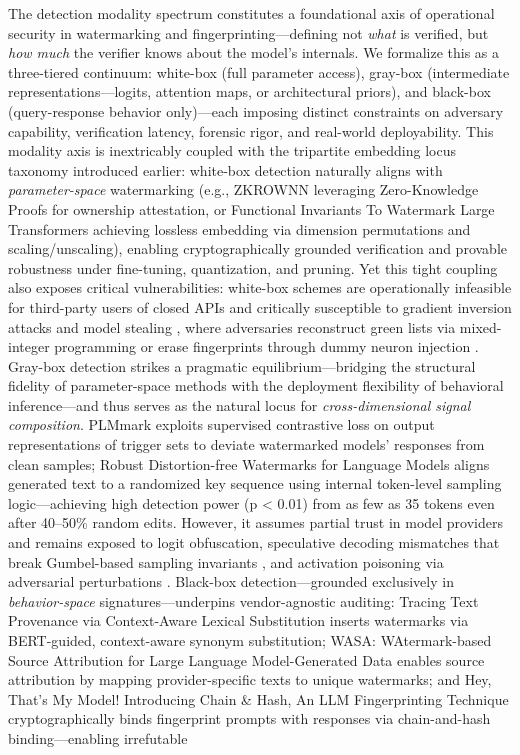 \documentclass[11pt,a4paper]{article}
\begin{document}
The detection modality spectrum constitutes a foundational axis of operational security in watermarking and fingerprinting---defining not \emph{what} is verified, but \emph{how much} the verifier knows about the model's internals. We formalize this as a three-tiered continuum: white-box (full parameter access), gray-box (intermediate representations---logits, attention maps, or architectural priors), and black-box (query-response behavior only)---each imposing distinct constraints on adversary capability, verification latency, forensic rigor, and real-world deployability. This modality axis is inextricably coupled with the tripartite embedding locus taxonomy introduced earlier: white-box detection naturally aligns with \emph{parameter-space} watermarking (e.g., ZKROWNN \cite{doi:10.1109/dac56929.2023.10247798} leveraging Zero-Knowledge Proofs for ownership attestation, or Functional Invariants To Watermark Large Transformers \cite{doi:10.1109/icassp48485.2024.10447264} achieving lossless embedding via dimension permutations and scaling/unscaling), enabling cryptographically grounded verification and provable robustness under fine-tuning, quantization, and pruning. Yet this tight coupling also exposes critical vulnerabilities: white-box schemes are operationally infeasible for third-party users of closed APIs and critically susceptible to gradient inversion attacks \cite{doi:10.1145/3580305.3599291} and model stealing \cite{arxiv:2402.19361}, where adversaries reconstruct green lists via mixed-integer programming \cite{arxiv:2405.19677} or erase fingerprints through dummy neuron injection \cite{arxiv:2303.09732}. Gray-box detection strikes a pragmatic equilibrium---bridging the structural fidelity of parameter-space methods with the deployment flexibility of behavioral inference---and thus serves as the natural locus for \emph{cross-dimensional signal composition}. PLMmark \cite{arxiv:2402.16187} exploits supervised contrastive loss on output representations of trigger sets to deviate watermarked models' responses from clean samples; Robust Distortion-free Watermarks for Language Models \cite{arxiv:2307.15593} aligns generated text to a randomized key sequence using internal token-level sampling logic---achieving high detection power (p < 0.01) from as few as 35 tokens even after 40--50\% random edits. However, it assumes partial trust in model providers and remains exposed to logit obfuscation, speculative decoding mismatches that break Gumbel-based sampling invariants \cite{arxiv:2402.05864}, and activation poisoning via adversarial perturbations \cite{doi:10.1016/j.comcom.2019.12.016}. Black-box detection---grounded exclusively in \emph{behavior-space} signatures---underpins vendor-agnostic auditing: Tracing Text Provenance via Context-Aware Lexical Substitution \cite{doi:10.1609/aaai.v36i10.21415} inserts watermarks via BERT-guided, context-aware synonym substitution; WASA: WAtermark-based Source Attribution for Large Language Model-Generated Data \cite{arxiv:2310.00646} enables source attribution by mapping provider-specific texts to unique watermarks; and Hey, That's My Model! Introducing Chain \& Hash, An LLM Fingerprinting Technique \cite{arxiv:2407.10887} cryptographically binds fingerprint prompts with responses via chain-and-hash binding---enabling irrefutable 
\end{document}
